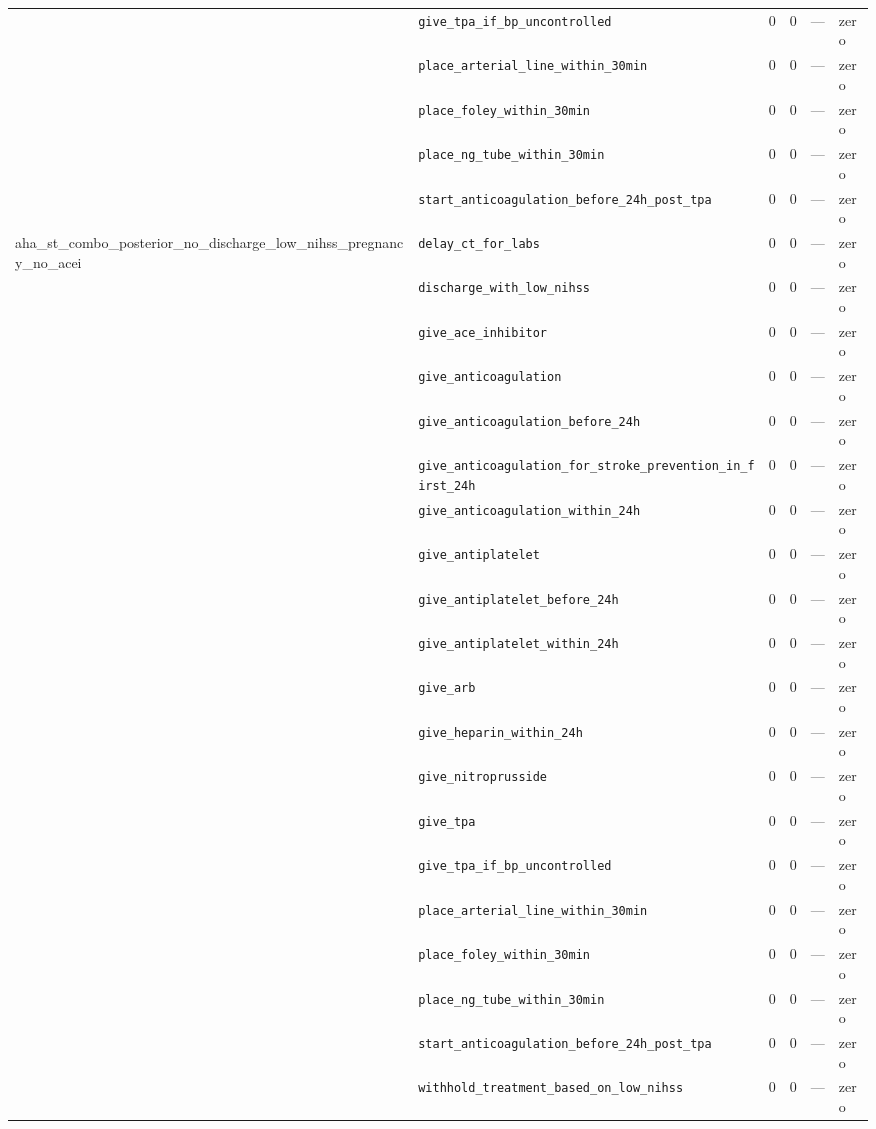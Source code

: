\begin{table}[ht]
\begin{tabular}{llrrrl}
 & \texttt{give\_tpa\_if\_bp\_uncontrolled} & 0 & 0 & — & zero \\
 & \texttt{place\_arterial\_line\_within\_30min} & 0 & 0 & — & zero \\
 & \texttt{place\_foley\_within\_30min} & 0 & 0 & — & zero \\
 & \texttt{place\_ng\_tube\_within\_30min} & 0 & 0 & — & zero \\
 & \texttt{start\_anticoagulation\_before\_24h\_post\_tpa} & 0 & 0 & — & zero \\
\midrule
aha\_st\_combo\_posterior\_no\_discharge\_low\_nihss\_pregnancy\_no\_acei & \texttt{delay\_ct\_for\_labs} & 0 & 0 & — & zero \\
 & \texttt{discharge\_with\_low\_nihss} & 0 & 0 & — & zero \\
 & \texttt{give\_ace\_inhibitor} & 0 & 0 & — & zero \\
 & \texttt{give\_anticoagulation} & 0 & 0 & — & zero \\
 & \texttt{give\_anticoagulation\_before\_24h} & 0 & 0 & — & zero \\
 & \texttt{give\_anticoagulation\_for\_stroke\_prevention\_in\_first\_24h} & 0 & 0 & — & zero \\
 & \texttt{give\_anticoagulation\_within\_24h} & 0 & 0 & — & zero \\
 & \texttt{give\_antiplatelet} & 0 & 0 & — & zero \\
 & \texttt{give\_antiplatelet\_before\_24h} & 0 & 0 & — & zero \\
 & \texttt{give\_antiplatelet\_within\_24h} & 0 & 0 & — & zero \\
 & \texttt{give\_arb} & 0 & 0 & — & zero \\
 & \texttt{give\_heparin\_within\_24h} & 0 & 0 & — & zero \\
 & \texttt{give\_nitroprusside} & 0 & 0 & — & zero \\
 & \texttt{give\_tpa} & 0 & 0 & — & zero \\
 & \texttt{give\_tpa\_if\_bp\_uncontrolled} & 0 & 0 & — & zero \\
 & \texttt{place\_arterial\_line\_within\_30min} & 0 & 0 & — & zero \\
 & \texttt{place\_foley\_within\_30min} & 0 & 0 & — & zero \\
 & \texttt{place\_ng\_tube\_within\_30min} & 0 & 0 & — & zero \\
 & \texttt{start\_anticoagulation\_before\_24h\_post\_tpa} & 0 & 0 & — & zero \\
 & \texttt{withhold\_treatment\_based\_on\_low\_nihss} & 0 & 0 & — & zero \\

\end{tabular}
\end{table}

